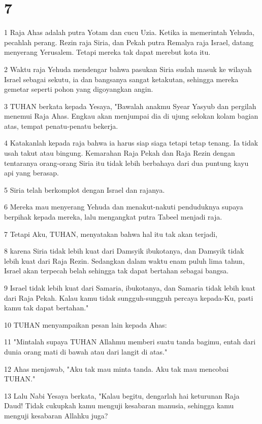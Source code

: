 \chapter{7}

\par 1 Raja Ahas adalah putra Yotam dan cucu Uzia. Ketika ia memerintah Yehuda, pecahlah perang. Rezin raja Siria, dan Pekah putra Remalya raja Israel, datang menyerang Yerusalem. Tetapi mereka tak dapat merebut kota itu.
\par 2 Waktu raja Yehuda mendengar bahwa pasukan Siria sudah masuk ke wilayah Israel sebagai sekutu, ia dan bangsanya sangat ketakutan, sehingga mereka gemetar seperti pohon yang digoyangkan angin.
\par 3 TUHAN berkata kepada Yesaya, "Bawalah anakmu Syear Yasyub dan pergilah menemui Raja Ahas. Engkau akan menjumpai dia di ujung selokan kolam bagian atas, tempat penatu-penatu bekerja.
\par 4 Katakanlah kepada raja bahwa ia harus siap siaga tetapi tetap tenang. Ia tidak usah takut atau bingung. Kemarahan Raja Pekah dan Raja Rezin dengan tentaranya orang-orang Siria itu tidak lebih berbahaya dari dua puntung kayu api yang berasap.
\par 5 Siria telah berkomplot dengan Israel dan rajanya.
\par 6 Mereka mau menyerang Yehuda dan menakut-nakuti penduduknya supaya berpihak kepada mereka, lalu mengangkat putra Tabeel menjadi raja.
\par 7 Tetapi Aku, TUHAN, menyatakan bahwa hal itu tak akan terjadi,
\par 8 karena Siria tidak lebih kuat dari Damsyik ibukotanya, dan Damsyik tidak lebih kuat dari Raja Rezin. Sedangkan dalam waktu enam puluh lima tahun, Israel akan terpecah belah sehingga tak dapat bertahan sebagai bangsa.
\par 9 Israel tidak lebih kuat dari Samaria, ibukotanya, dan Samaria tidak lebih kuat dari Raja Pekah. Kalau kamu tidak sungguh-sungguh percaya kepada-Ku, pasti kamu tak dapat bertahan."
\par 10 TUHAN menyampaikan pesan lain kepada Ahas:
\par 11 "Mintalah supaya TUHAN Allahmu memberi suatu tanda bagimu, entah dari dunia orang mati di bawah atau dari langit di atas."
\par 12 Ahas menjawab, "Aku tak mau minta tanda. Aku tak mau mencobai TUHAN."
\par 13 Lalu Nabi Yesaya berkata, "Kalau begitu, dengarlah hai keturunan Raja Daud! Tidak cukupkah kamu menguji kesabaran manusia, sehingga kamu menguji kesabaran Allahku juga?
